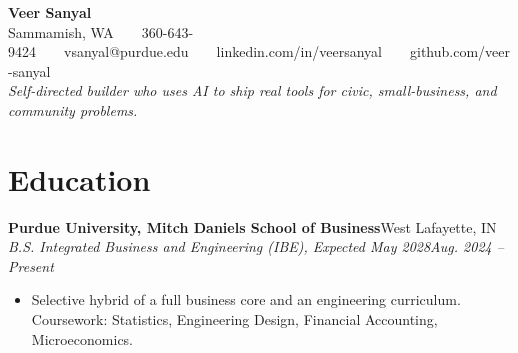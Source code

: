 \documentclass[10pt,letterpaper]{article}
\newcommand{\entry}[4]{%
  \textbf{#1}\hfill #2\\[1pt]
  \textit{#3}\hfill \textit{#4}\\[1pt]
}
\begin{document}
\begin{center}
{\LARGE \textbf{Veer Sanyal}}\\[3pt]
{\small Sammamish, WA~~\textbar~~360-643-9424~~\textbar~~vsanyal@purdue.edu~~\textbar~~linkedin.com/in/veersanyal~~\textbar~~github.com/veer-sanyal}\\[3pt]
\textit{Self-directed builder who uses AI to ship real tools for civic, small-business, and community problems.}
\end{center}

\section{Education}
\entry{Purdue University, Mitch Daniels School of Business}{West Lafayette, IN}{B.S. Integrated Business and Engineering (IBE), Expected May 2028}{Aug. 2024 -- Present}
\begin{itemize}
  \item Selective hybrid of a full business core and an engineering curriculum. Coursework: Statistics, Engineering Design, Financial Accounting, Microeconomics.
\end{itemize}
\end{document}

